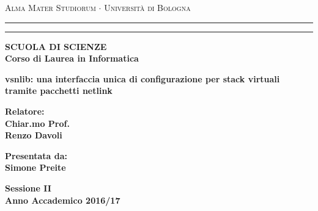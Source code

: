 \begin{titlepage}
\begin{center}
{{\Large{\textsc{Alma Mater Studiorum $\cdot$ Universit\`a di
Bologna}}}} \rule[0.1cm]{15.8cm}{0.1mm}
\rule[0.5cm]{15.8cm}{0.6mm}
{\bf SCUOLA DI SCIENZE\\
Corso di Laurea in Informatica }
\end{center}
\vspace{35mm}
\begin{center}
{\LARGE{\bf vsnlib: una interfaccia unica di configurazione per stack virtuali tramite pacchetti netlink}}\\
\end{center}
\vspace{40mm}
\par
\noindent
\begin{minipage}[t]{0.47\textwidth}
{\large{\bf Relatore:\\
Chiar.mo Prof.\\
Renzo Davoli}}\\
\end{minipage}
\hfill
\begin{minipage}[t]{0.47\textwidth}\raggedleft
{\large{\bf Presentata da:\\
Simone Preite}}
\end{minipage}
\vspace{20mm}
\begin{center}
{\large{\bf Sessione II\\%
Anno Accademico 2016/17}}%
\end{center}
\end{titlepage}
